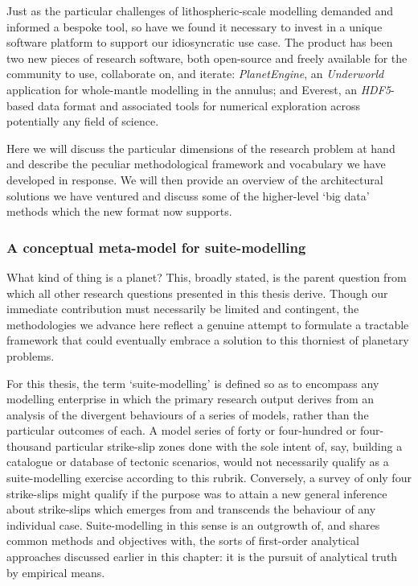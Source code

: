 \documentclass[a4paper,11pt,oneside]{book}
\begin{document}
Just as the particular challenges of lithospheric-scale modelling demanded and informed a bespoke tool, so have we found it necessary to invest in a unique software platform to support our idiosyncratic use case. The product has been two new pieces of research software, both open-source and freely available for the community to use, collaborate on, and iterate: \textit{PlanetEngine}, an \textit{Underworld} application for whole-mantle modelling in the annulus; and Everest, an \textit{HDF5}-based data format and associated tools for numerical exploration across potentially any field of science.

Here we will discuss the particular dimensions of the research problem at hand and describe the peculiar methodological framework and vocabulary we have developed in response. We will then provide an overview of the architectural solutions we have ventured and discuss some of the higher-level `big data' methods which the new format now supports.

\subsubsection{A conceptual meta-model for suite-modelling}

What kind of thing is a planet? This, broadly stated, is the parent question from which all other research questions presented in this thesis derive. Though our immediate contribution must necessarily be limited and contingent, the methodologies we advance here reflect a genuine attempt to formulate a tractable framework that could eventually embrace a solution to this thorniest of planetary problems.

For this thesis, the term `suite-modelling' is defined so as to encompass any modelling enterprise in which the primary research output derives from an analysis of the divergent behaviours of a series of models, rather than the particular outcomes of each. A model series of forty or four-hundred or four-thousand particular strike-slip zones done with the sole intent of, say, building a catalogue or database of tectonic scenarios, would not necessarily qualify as a suite-modelling exercise according to this rubrik. Conversely, a survey of only four strike-slips might qualify if the purpose was to attain a new general inference about strike-slips which emerges from and transcends the behaviour of any individual case. Suite-modelling in this sense is an outgrowth of, and shares common methods and objectives with, the sorts of first-order analytical approaches discussed earlier in this chapter: it is the pursuit of analytical truth by empirical means.
\end{document}
